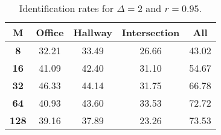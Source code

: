 \begin{table}[h]
    \footnotesize
    \centering
    \begin{tabular}{|c|c|c|c|l|}    
    \hline
    {\bf M} & {\bf Office} & {\bf Hallway} & {\bf Intersection} &     \multicolumn{1}{c|}{{\bf All}} \\ \hline
    {\bf 8} & 32.21 & 33.49 & 26.66 & 43.02 \\ \hline
    {\bf 16} & 41.09 & 42.40 & 31.10 & 54.67 \\ \hline
    {\bf 32} & 46.33 & 44.14 & 31.75 & 66.78 \\ \hline
    {\bf 64} & 40.93 & 43.60 & 33.53 & 72.72 \\ \hline
    {\bf 128} & 39.16 & 37.89 & 23.26 & 73.53 \\ \hline
    \end{tabular}
    \caption{Identification rates for $\Delta = 2$ and $r = 0.95$.}    
    \label{tab:identify_speakers_0.95_mit_19_2}
\end{table}
